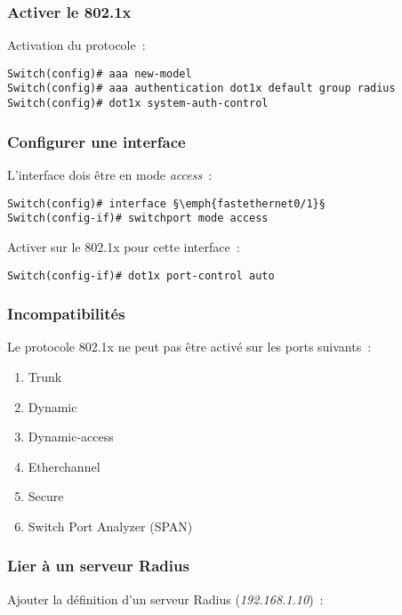 \subsubsection{Activer le 802.1x}

Activation du protocole~:

\begin{lstlisting}
Switch(config)# aaa new-model
Switch(config)# aaa authentication dot1x default group radius
Switch(config)# dot1x system-auth-control
\end{lstlisting}

\subsubsection{Configurer une interface}

L'interface dois être en mode \emph{access}~:

\begin{lstlisting}
Switch(config)# interface §\emph{fastethernet0/1}§
Switch(config-if)# switchport mode access
\end{lstlisting}

Activer sur le 802.1x pour cette interface~:

\begin{lstlisting}
Switch(config-if)# dot1x port-control auto
\end{lstlisting}

\subsubsection{Incompatibilités}

Le protocole 802.1x ne peut pas être activé sur les ports suivants~:

\begin{enumerate}
\item Trunk
\item Dynamic
\item Dynamic-access
\item Etherchannel
\item Secure
\item Switch Port Analyzer (SPAN)
\end{enumerate}

\subsubsection{Lier à un serveur Radius}

Ajouter la définition d'un serveur Radius (\emph{192.168.1.10})~:

